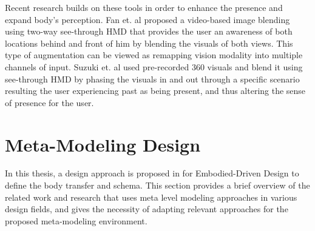 Recent research builds on these tools in order to enhance the presence and expand body's perception. Fan et. al \cite{fan2014acm} proposed a video-based image blending using two-way see-through HMD that provides the user an awareness of both locations behind and front of him by blending the visuals of both views. This type of augmentation can be viewed as remapping vision modality into multiple channels of input. Suzuki et. al \cite{suzuki2012substitutional} used pre-recorded 360 visuals and blend it using see-through HMD by phasing the visuals in and out through a specific scenario resulting the user experiencing past as being present, and thus altering the sense of presence for the user.

\section{Meta-Modeling Design}

In this thesis, a design approach is proposed in  for Embodied-Driven Design to define the body transfer and schema. This section provides a brief overview of the related work and research that uses meta level modeling approaches in various design fields, and gives the necessity of adapting relevant approaches for the proposed meta-modeling environment. 

